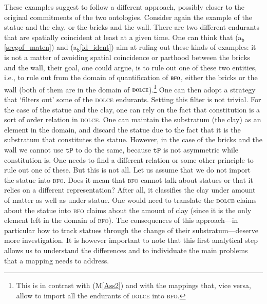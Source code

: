 \documentclass[ao]{iosart2x}
\newcommand{\nb}[1]{\textcolor{red}{$|$}\marginpar{\hspace*{-0cm}\parbox{20mm}{\scriptsize\raggedright\textcolor{red}{#1}}}}
\newcommand{\bfoAxLabel}{\textrm{a$_\texttt{b}$}}
\newcommand{\refbfoax}[1]{({\bfoAxLabel}\ref{#1})}
\newcommand{\pr}[1]{\mathtt{#1}}
\newcommand{\dolce}{{\textsc{dolce}}}
\newcommand{\bfo}{{\textsc{bfo}}}
\newcommand {\TPd} {\ensuremath{\pr{tP}}}
\begin{document}
These examples suggest to follow a different approach, possibly closer to the original commitments of the two ontologies. Consider again the example of the statue and the clay, or the bricks and the wall. There are two different endurants that are spatially coincident at least at a given time. One can think that \refbfoax{sregof_maten} and \refbfoax{id_idcnt} aim at ruling out these kinds of examples: it is not a matter of avoiding spatial coincidence or parthood between the bricks and the wall, their goal, one could argue, is to rule out one of these two entities, i.e., to rule out from the domain  of quantification of $\bfo$, either the bricks or the wall (both of them are in the domain of $\dolce$).\footnote{This is in contrast with (M\ref{Ass2}) and with the mappings that, vice versa, allow to import all the endurants of {\dolce} into {\bfo}.}
One can then adopt a strategy that `filters out' some of the {\dolce} endurants. Setting this filter is not trivial. For the case of the statue and the clay, one can rely on the fact that constitution is a sort of order relation in {\dolce}. One can maintain the substratum (the clay) as an element in the domain, and discard the statue due to the fact that it is the substratum that constitutes the statue. However, in the case of the bricks and the wall we cannot use $\TPd$ to do the same, because $\TPd$ is not asymmetric while constitution is.
One needs to find a different relation or some other principle to rule out one of these. But this is not all. Let us assume that we do not import the statue into {\bfo}. Does it mean that {\bfo} cannot talk about statues or that it relies on a different representation? After all, it classifies the clay under amount of matter as well as under statue. One would need to translate the {\dolce} claims about the statue into {\bfo} claims about the amount of clay %
(since it is the only element left in the domain of {\bfo}). The consequences of this approach---in particular how to track statues through the change of their substratum---deserve more investigation.  It is however important to note that this first analytical step allows us to understand the differences and to individuate the main problems that a mapping needs to address.%
\end{document}
